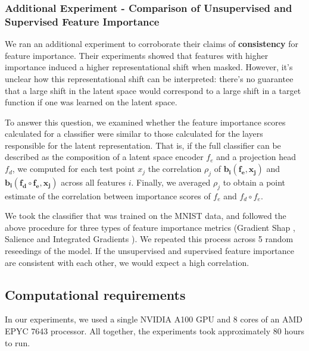 \subsubsection{Additional Experiment - Comparison of Unsupervised and Supervised Feature Importance}

We ran an additional experiment to corroborate their claims of \textbf{consistency} for feature importance. Their experiments showed that features with higher importance induced a higher representational shift when masked. However, it's unclear how this representational shift can be interpreted: there's no guarantee that a large shift in the latent space would correspond to a large shift in a target function if one was learned on the latent space.


To answer this question, we examined whether the feature importance scores calculated for a classifier were similar to those calculated for the layers responsible for the latent representation. That is, if the full classifier can be described as the composition of a latent space encoder $f_e$ and a projection head $f_d$, we computed for each test point $x_j$ the correlation $\rho_j$ of $\mathbf{b_i(f_e, x_j)}$ and $\mathbf{b_i(f_d \circ f_e, x_j)}$ across all features $i$. Finally, we averaged $\rho_j$ to obtain a point estimate of the correlation between importance scores of $f_e$ and $f_d \circ f_e$.

We took the classifier that was trained on the MNIST data, and followed the above procedure for three types of feature importance metrics (Gradient Shap \cite{lundberg2017unified}, Salience \cite{simonyan2013deep} and Integrated Gradients \cite{sundararajan2017axiomatic}). We repeated this process across 5 random reseedings of the model. If the unsupervised and supervised feature importance are consistent with each other, we would expect a high correlation.


\subsection{Computational requirements}

In our experiments, we used a single NVIDIA A100 GPU and 8 cores of an AMD EPYC 7643 processor. All together, the experiments took approximately 80 hours to run. 


